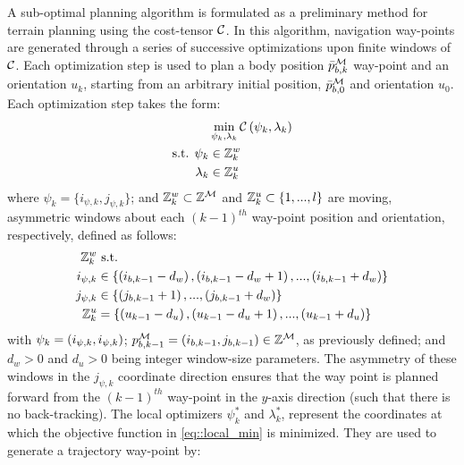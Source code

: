 			A sub-optimal planning algorithm is formulated as a preliminary method for terrain planning using the cost-tensor ${\cal C}$. In this algorithm, navigation way-points are generated through a series of successive optimizations upon finite windows of  ${\cal C}$. Each optimization step is used to plan a body position $\bar{p}^{{\cal M}}_{b,k}$ way-point and an orientation $u_{k}$, starting from an arbitrary initial position, $\bar{p}^{{\cal M}}_{b,0}$ and orientation $u_{0}$. Each optimization step takes the form:
				\begin{equation}
					\begin{split}
							&	\min_{\psi_{k},\lambda_{k}}{\cal C}\left(\psi_{k},\lambda_{k}\right) 	\\
					\text{s.t. }	\psi_{k}&\in{\Bbb Z}^{w}_{k}							\\
									\lambda_{k}&\in{\Bbb Z}^{u}_{k}
					\end{split}
					\label{eq::local_min}
				\end{equation}
			where $\psi_{k}=\{i_{\psi,k},j_{\psi,k}\}$; and ${\Bbb Z}^{w}_{k}\subset{\Bbb Z}^{{\cal M}}$ and ${\Bbb Z}^{u}_{k}\subset \{ 1,...,l \}$ are moving, asymmetric windows about each $(k-1)^{th}$ way-point position and orientation, respectively, defined as follows:
				\begin{equation}
					\begin{split}
						{\Bbb Z}^{w}_{k} & \text{ s.t.}  \\
						i_{\psi,k} 	& \in \{ \left(i_{b,k-1}-d_{w}\right),\left(i_{b,k-1}-d_{w}+1\right),...,\left(i_{b,k-1}+d_{w}\right) \} 	\\
						j_{\psi,k} 	& \in \{ \left(j_{b,k-1}+1\right),...,\left(j_{b,k-1}+d_{w}\right) \} 	\\
						{\Bbb Z}^{u}_{k}	&=   \{ \left(u_{k-1}-d_{u}\right), \left(u_{k-1}-d_{u}+1\right), ... , \left(u_{k-1}+d_{u}\right) \}
					\end{split}
					\label{eq::windows}
				\end{equation}			
			with $\psi_{k} = \left(i_{\psi,k},i_{\psi,k}\right)$; $p_{b,k-1}^{{\cal M}} = \left(i_{b,k-1},j_{b,k-1}\right) \in {\Bbb Z}^{{\cal M}}$, as previously defined; and $d_{w}>0$ and $d_{u}>0$ being integer window-size parameters. The asymmetry of these windows in the $j_{\psi,k}$ coordinate direction ensures that the \Kth way point is planned forward from the $(k-1)^{th}$ way-point in the $y$-axis direction (\IE such that there is no back-tracking). The local optimizers $\psi_{k}^{*}$ and $\lambda_{k}^{*}$, represent the coordinates at which the objective function in \ref{eq::local_min} is minimized. They are used to generate a \Kth trajectory way-point by:
